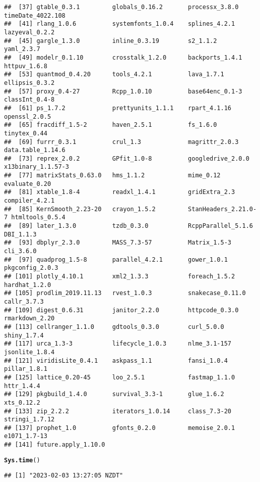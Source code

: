 \documentclass{article}\usepackage[]{graphicx}\usepackage[]{xcolor}
\makeatletter
\newcommand{\hlstd}[1]{\textcolor[rgb]{0.345,0.345,0.345}{#1}}%
\newcommand{\hlkwd}[1]{\textcolor[rgb]{0.737,0.353,0.396}{\textbf{#1}}}%
\newenvironment{kframe}{%
 \def\at@end@of@kframe{}%
 \ifinner\ifhmode%
  \def\at@end@of@kframe{\end{minipage}}%
  \begin{minipage}{\columnwidth}%
 \fi\fi%
 \def\FrameCommand##1{\hskip\@totalleftmargin \hskip-\fboxsep
 \colorbox{shadecolor}{##1}\hskip-\fboxsep
     \hskip-\linewidth \hskip-\@totalleftmargin \hskip\columnwidth}%
 \MakeFramed {\advance\hsize-\width
   \@totalleftmargin\z@ \linewidth\hsize
   \@setminipage}}%
 {\par\unskip\endMakeFramed%
 \at@end@of@kframe}
\newenvironment{knitrout}{}{} %
\makeatother
\begin{document}
\begin{knitrout}
\begin{kframe}
\begin{verbatim}
##  [37] gtable_0.3.1         globals_0.16.2       processx_3.8.0       timeDate_4022.108   
##  [41] rlang_1.0.6          systemfonts_1.0.4    splines_4.2.1        lazyeval_0.2.2      
##  [45] gargle_1.3.0         inline_0.3.19        s2_1.1.2             yaml_2.3.7          
##  [49] modelr_0.1.10        crosstalk_1.2.0      backports_1.4.1      httpuv_1.6.8        
##  [53] quantmod_0.4.20      tools_4.2.1          lava_1.7.1           ellipsis_0.3.2      
##  [57] proxy_0.4-27         Rcpp_1.0.10          base64enc_0.1-3      classInt_0.4-8      
##  [61] ps_1.7.2             prettyunits_1.1.1    rpart_4.1.16         openssl_2.0.5       
##  [65] fracdiff_1.5-2       haven_2.5.1          fs_1.6.0             tinytex_0.44        
##  [69] furrr_0.3.1          crul_1.3             magrittr_2.0.3       data.table_1.14.6   
##  [73] reprex_2.0.2         GPfit_1.0-8          googledrive_2.0.0    x13binary_1.1.57-3  
##  [77] matrixStats_0.63.0   hms_1.1.2            mime_0.12            evaluate_0.20       
##  [81] xtable_1.8-4         readxl_1.4.1         gridExtra_2.3        compiler_4.2.1      
##  [85] KernSmooth_2.23-20   crayon_1.5.2         StanHeaders_2.21.0-7 htmltools_0.5.4     
##  [89] later_1.3.0          tzdb_0.3.0           RcppParallel_5.1.6   DBI_1.1.3           
##  [93] dbplyr_2.3.0         MASS_7.3-57          Matrix_1.5-3         cli_3.6.0           
##  [97] quadprog_1.5-8       parallel_4.2.1       gower_1.0.1          pkgconfig_2.0.3     
## [101] plotly_4.10.1        xml2_1.3.3           foreach_1.5.2        hardhat_1.2.0       
## [105] prodlim_2019.11.13   rvest_1.0.3          snakecase_0.11.0     callr_3.7.3         
## [109] digest_0.6.31        janitor_2.2.0        httpcode_0.3.0       rmarkdown_2.20      
## [113] cellranger_1.1.0     gdtools_0.3.0        curl_5.0.0           shiny_1.7.4         
## [117] urca_1.3-3           lifecycle_1.0.3      nlme_3.1-157         jsonlite_1.8.4      
## [121] viridisLite_0.4.1    askpass_1.1          fansi_1.0.4          pillar_1.8.1        
## [125] lattice_0.20-45      loo_2.5.1            fastmap_1.1.0        httr_1.4.4          
## [129] pkgbuild_1.4.0       survival_3.3-1       glue_1.6.2           xts_0.12.2          
## [133] zip_2.2.2            iterators_1.0.14     class_7.3-20         stringi_1.7.12      
## [137] prophet_1.0          gfonts_0.2.0         memoise_2.0.1        e1071_1.7-13        
## [141] future.apply_1.10.0
\end{verbatim}
\begin{alltt}
\hlkwd{Sys.time}\hlstd{()}
\end{alltt}
\begin{verbatim}
## [1] "2023-02-03 13:27:05 NZDT"
\end{verbatim}
\end{kframe}
\end{knitrout}
\end{document}
